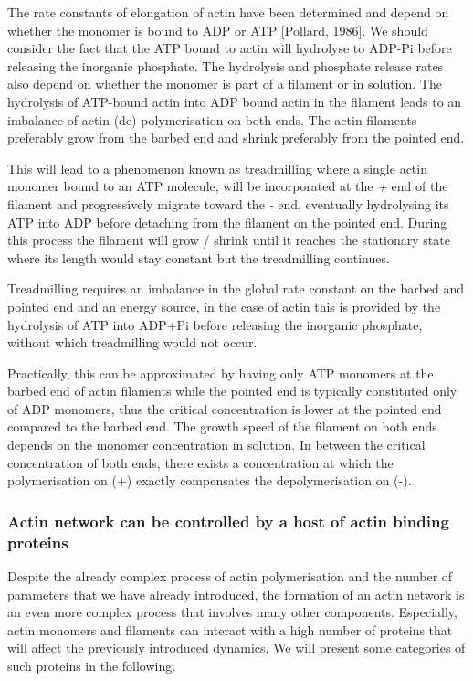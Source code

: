 \documentclass[A4paperpaper,11pt,english]{sphinxmanual}
\begin{document}
The rate constants of elongation of actin have been determined and depend on
whether the monomer is bound to ADP or ATP {\hyperref[index-latex:pollard1986]{{[}Pollard,  1986{]}}}. We should
consider the fact that the  ATP bound to actin will hydrolyse to ADP-Pi before releasing
the inorganic phosphate. The hydrolysis and phosphate release rates also depend on whether the
monomer is part of a filament or in solution. The hydrolysis of ATP-bound
actin into ADP bound actin in the filament  leads to an imbalance of actin
(de)-polymerisation on both ends. The actin filaments preferably
grow from the barbed end and shrink preferably from the pointed end.

This will lead to a phenomenon known as treadmilling where a single actin
monomer bound to an ATP molecule, will be incorporated at the \emph{+} end of the
filament and progressively migrate toward the \emph{-} end, eventually hydrolysing its
ATP into ADP before detaching from the filament on the pointed end. During this
process the filament will grow / shrink until it reaches the stationary state
where its length would stay constant but the treadmilling continues.

Treadmilling requires an imbalance in the global rate constant on the barbed and
pointed end and an energy source, in the case of actin this is provided by the
hydrolysis of ATP into ADP+Pi before releasing the inorganic phosphate, without
which treadmilling would not occur.

Practically, this can be approximated by having only ATP monomers at the barbed
end of actin filaments while the pointed end is typically constituted only of
ADP monomers, thus the critical concentration is lower at the  pointed end
compared to the barbed end. The growth speed of the filament on both
ends depends on the monomer concentration in solution. In between the
critical concentration of both ends, there exists a concentration at which the
polymerisation on (+) exactly compensates the depolymerisation on (-).


\subsubsection{Actin network can be controlled by a host of actin binding proteins}
\label{index-latex:actin-network-can-be-controlled-by-a-host-of-actin-binding-proteins}
Despite the already complex process of actin polymerisation and the
number of parameters that we have already introduced, the formation of an actin
network is an even more complex process that involves many other components.
Especially, actin monomers and filaments can interact with a high number of
proteins that will affect the previously introduced dynamics.  We will present
some categories of such proteins in the following.
\end{document}

